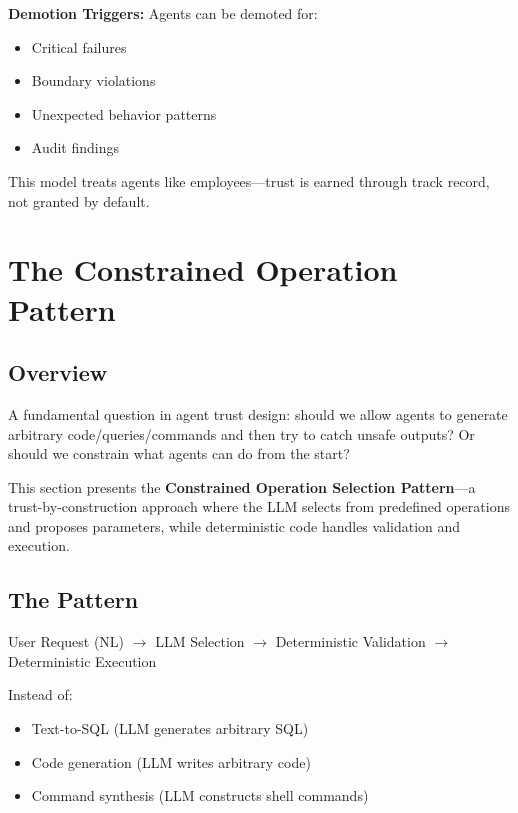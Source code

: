 \textbf{Demotion Triggers:}
Agents can be demoted for:
\begin{itemize}
    \item Critical failures
    \item Boundary violations
    \item Unexpected behavior patterns
    \item Audit findings
\end{itemize}

This model treats agents like employees---trust is earned through track record, not granted by default.

\section{The Constrained Operation Pattern}
\label{sec:constrained-operation}

\subsection{Overview}
\label{subsec:constrained-overview}

A fundamental question in agent trust design: should we allow agents to generate arbitrary code/queries/commands and then try to catch unsafe outputs? Or should we constrain what agents can do from the start?

This section presents the \textbf{Constrained Operation Selection Pattern}---a trust-by-construction approach where the LLM selects from predefined operations and proposes parameters, while deterministic code handles validation and execution.

\subsection{The Pattern}
\label{subsec:constrained-pattern}

\begin{center}
User Request (NL) $\rightarrow$ LLM Selection $\rightarrow$ Deterministic Validation $\rightarrow$ Deterministic Execution
\end{center}

Instead of:
\begin{itemize}
    \item Text-to-SQL (LLM generates arbitrary SQL)
    \item Code generation (LLM writes arbitrary code)
    \item Command synthesis (LLM constructs shell commands)
\end{itemize}

